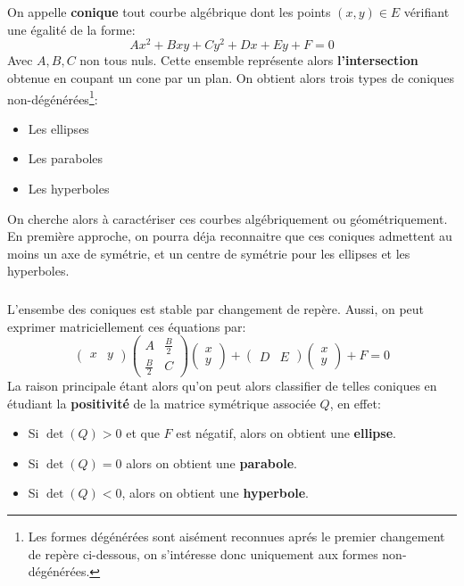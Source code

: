 \chapter*{} %
On appelle \textbf{conique} tout courbe algébrique dont les points \((x, y) \in E\) vérifiant une égalité de la forme:
\[
   Ax^2 + Bxy + Cy^2 + Dx + Ey + F = 0  
\]
Avec \(A, B, C\) non tous nuls. Cette ensemble représente alors \textbf{l'intersection} obtenue en coupant un cone par un plan. On obtient alors trois types de coniques non-dégénérées\footnote[1]{Les formes dégénérées sont aisément reconnues aprés le premier changement de repère ci-dessous, on s'intéresse donc uniquement aux formes non-dégénérées.}:
\begin{itemize}
   \item Les ellipses
   \item Les paraboles
   \item Les hyperboles
\end{itemize}
On cherche alors à caractériser ces courbes algébriquement ou géométriquement. En première approche, on pourra déja reconnaitre que ces coniques admettent au moins un axe de symétrie, et un centre de symétrie pour les ellipses et les hyperboles.

\subsection*{}
L'ensembe des coniques est stable par changement de repère. Aussi, on peut exprimer matriciellement ces équations par:
\[
   \begin{pmatrix}x & y\end{pmatrix}\begin{pmatrix}
      A & \frac{B}{2} \\
      \frac{B}{2} & C
   \end{pmatrix} \begin{pmatrix}x \\ y\end{pmatrix} + \begin{pmatrix}D & E\end{pmatrix} \begin{pmatrix}x \\ y\end{pmatrix} + F = 0
\]
La raison principale étant alors qu'on peut alors classifier de telles coniques en étudiant la \textbf{positivité} de la matrice symétrique associée \(Q\), en effet:
\begin{itemize}
   \item Si \(\det({Q}) > 0\) et que \(F\) est négatif, alors on obtient une \textbf{ellipse}.
   \item Si \(\det({Q}) = 0\) alors on obtient une \textbf{parabole}.
   \item Si \(\det({Q}) < 0\), alors on obtient une \textbf{hyperbole}.
\end{itemize}

